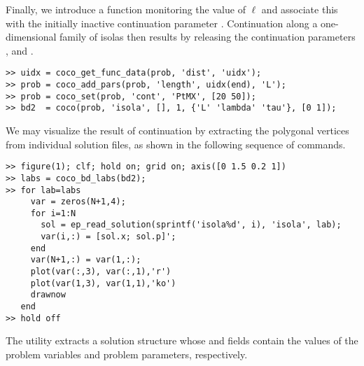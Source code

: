 Finally, we introduce a function monitoring the value of $\ell$ and associate this with the initially inactive continuation parameter . Continuation along a one-dimensional family of isolas then results by releasing the continuation parameters ,  and .
\begin{lstlisting}[language=coco-highlight]
>> uidx = coco_get_func_data(prob, 'dist', 'uidx');
>> prob = coco_add_pars(prob, 'length', uidx(end), 'L');
>> prob = coco_set(prob, 'cont', 'PtMX', [20 50]);
>> bd2  = coco(prob, 'isola', [], 1, {'L' 'lambda' 'tau'}, [0 1]);
\end{lstlisting}

We may visualize the result of continuation by extracting the polygonal vertices from individual solution files, as shown in the following sequence of commands.
\begin{lstlisting}[language=coco-highlight]
>> figure(1); clf; hold on; grid on; axis([0 1.5 0.2 1])
>> labs = coco_bd_labs(bd2);
>> for lab=labs
     var = zeros(N+1,4);
     for i=1:N
       sol = ep_read_solution(sprintf('isola%d', i), 'isola', lab);
       var(i,:) = [sol.x; sol.p]';
     end
     var(N+1,:) = var(1,:);
     plot(var(:,3), var(:,1),'r')
     plot(var(1,3), var(1,1),'ko')
     drawnow
   end
>> hold off
\end{lstlisting}
The  utility  extracts a solution structure whose  and  fields contain the values of the problem variables and problem parameters, respectively.\\
\medskip

